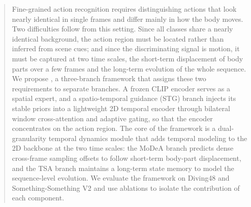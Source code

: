 \begin{abstract}
Fine-grained action recognition requires distinguishing actions that look
nearly identical in single frames and differ mainly in how the body moves.
Two difficulties follow from this setting. Since all classes share a nearly
identical background, the action region must be located rather than inferred
from scene cues; and since the discriminating signal is motion, it must be
captured at two time scales, the short-term displacement of body parts over a
few frames and the long-term evolution of the whole sequence. We propose
\dgtdm, a three-branch framework that assigns these two requirements to
separate branches. A frozen CLIP encoder serves as a spatial expert, and a
spatio-temporal guidance (STG) branch injects its stable priors into a
lightweight 2D temporal encoder through bilateral window cross-attention and
adaptive gating, so that the encoder concentrates on the action region. The
core of the framework is a dual-granularity temporal dynamics module that
adds temporal modeling to the 2D backbone at the two time scales: the MoDeA
branch predicts dense cross-frame sampling offsets to follow short-term
body-part displacement, and the TSA branch maintains a long-term state
memory to model the sequence-level evolution. We evaluate the framework on
Diving48 and Something-Something V2 and use ablations to isolate the
contribution of each component.
\end{abstract}
